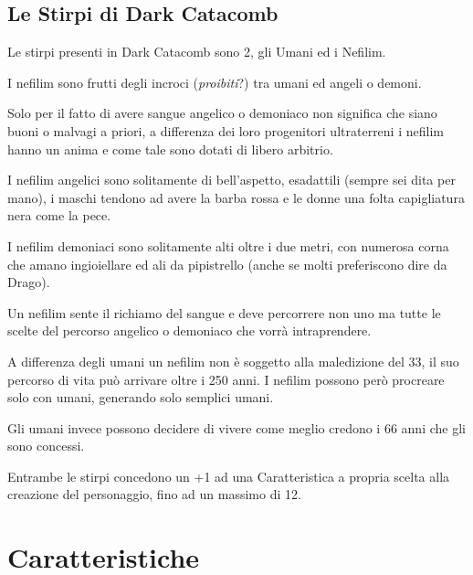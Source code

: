 \documentclass[12pt,a4paper,twoside,openany]{book}
\begin{document}
\begin{multicols}{2}
\subsection{Le Stirpi di Dark Catacomb}


Le stirpi presenti in Dark Catacomb sono 2, gli Umani ed i Nefilim.

I nefilim sono frutti degli incroci (\textit{proibiti}?) tra umani ed angeli o demoni.

Solo per il fatto di avere sangue angelico o demoniaco non significa che siano buoni o malvagi a priori, a differenza dei loro progenitori ultraterreni i nefilim hanno un anima e come tale sono dotati di libero arbitrio.

I nefilim angelici sono solitamente di bell'aspetto, esadattili (sempre sei dita per mano), i maschi tendono ad avere la barba rossa e le donne una folta capigliatura nera come la pece.

I nefilim demoniaci sono solitamente alti oltre i due metri, con numerosa corna che amano ingioiellare ed ali da pipistrello (anche se molti preferiscono dire da Drago).

Un nefilim sente il richiamo del sangue e deve percorrere non uno ma tutte le scelte del percorso angelico o demoniaco che vorrà intraprendere.

A differenza degli umani un nefilim non è soggetto alla maledizione del 33, il suo percorso di vita può arrivare oltre i 250 anni. I nefilim possono però procreare solo con umani, generando solo semplici umani.

Gli umani invece possono decidere di vivere come meglio credono i 66 anni che gli sono concessi.

Entrambe le stirpi concedono un +1 ad una Caratteristica a propria scelta alla creazione del personaggio, fino ad un massimo di 12.
	
\end{multicols}



\pagebreak

\section{Caratteristiche}
\end{document}
